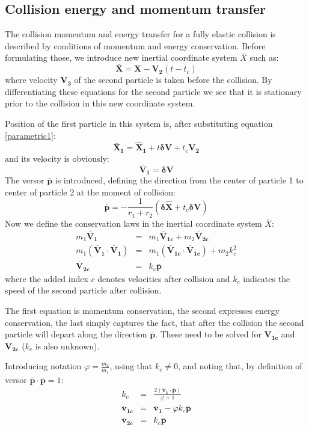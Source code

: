 \documentclass[10pt]{article}
\begin{document}
\subsection{Collision energy and momentum transfer}
The collision momentum and energy transfer for a fully elastic collision is described by conditions of momentum and energy conservation. Before formulating those, we introduce new inertial coordinate system $\bar X$ such as:
\begin{equation}
    \mathbf{\bar X}  = \mathbf{X} - \mathbf{V_2} (t-t_c)
\end{equation}
where velocity $\mathbf{V_2}$ of the second particle is taken before the collision. By differentiating these equations for the second particle we see that it is stationary prior to the collision in this new coordinate system.

Position of the first particle in this system is, after substituting equation \ref{parametric1}:
$$
  \mathbf{\bar X_1}  = 
  \mathbf{\hat X_1} + t\mathbf{\delta V} +t_c \mathbf{V_2}
$$
and its velocity is obviously:
$$
\mathbf{\bar V_1} = \mathbf{\delta V}
$$
The versor $\mathbf{\bar p}$ is introduced, defining the direction from the center of particle 1 to center of particle 2 at the moment of collision:
$$
\mathbf{\bar p} = -\frac{1}{r_1+r_2}(\mathbf{\delta \hat X}+t_c\mathbf{\delta V})
$$
Now we define the conservation laws in the inertial coordinate system $\bar X$:
\begin{eqnarray}
    m_1\mathbf{\bar V_1} & = & m_1\mathbf{\bar V_{1c}} + m_2 \mathbf{\bar V_{2c}} \\
    m_1(\mathbf{\bar V_1}\cdot\mathbf{\bar V_1}) & = &  m_1(\mathbf{\bar V_{1c}}\cdot\mathbf{\bar V_{1c}}) + m_2 k_c^2\\
    \mathbf{\bar V_{2c}}& = & k_c\mathbf{\bar p}
\end{eqnarray}
where the added index $c$ denotes velocities after collision and $k_c$ indicates the speed of the second particle after collision.

The first equation is momentum conservation, the second expresses energy conservation, the last simply captures the fact, that after the collision the second particle will depart along the direction $\mathbf{\bar p}$. These need to be solved for $\mathbf{V_{1c}}$ and $\mathbf{V_{2c}}$ ($k_c$ is also unknown).

Introducing notation $\varphi = \frac{m_2}{m_1}$, using that $k_c\neq0$, and noting that, by definition of versor $\mathbf{\bar p}\cdot\mathbf{\bar p}=1$:
\begin{eqnarray*}
    k_c & =&  \frac{2\left(\mathbf{\bar v_1} \cdot \mathbf{\bar p}\right)}{\varphi +  1} \\
    \mathbf{ \bar v_{1c}} & = &\mathbf{ \bar v_1} - \varphi k_c \mathbf{ \bar p} \\
    \mathbf{ \bar v_{2c}} & = & k_c \mathbf{ \bar p}
\end{eqnarray*}
\end{document}
